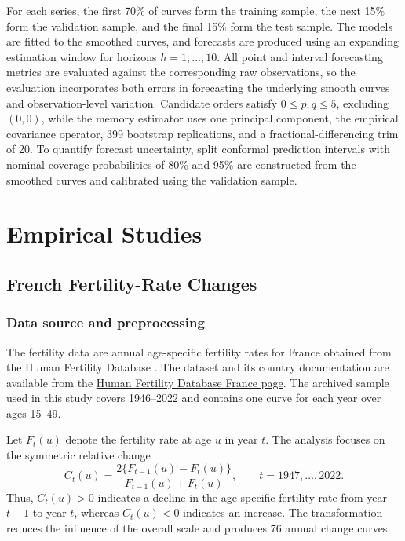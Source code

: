 For each series, the first 70\% of curves form the training sample, the next 15\% form the validation sample, and the final 15\% form the test sample. The models are fitted to the smoothed curves, and forecasts are produced using an expanding estimation window for horizons $h=1,\ldots,10$. All point and interval forecasting metrics are evaluated against the corresponding raw observations, so the evaluation incorporates both errors in forecasting the underlying smooth curves and observation-level variation. Candidate orders satisfy $0\leq p,q\leq5$, excluding $(0,0)$, while the memory estimator uses one principal component, the empirical covariance operator, 399 bootstrap replications, and a fractional-differencing trim of 20. To quantify forecast uncertainty, split conformal prediction intervals with nominal coverage probabilities of 80\% and 95\% are constructed from the smoothed curves and calibrated using the validation sample.

\section{Empirical Studies}
\label{sec:emp-studies}

\subsection{French Fertility-Rate Changes}
\label{sec:emp-fertility}

\subsubsection{Data source and preprocessing}

The fertility data are annual age-specific fertility rates for France obtained from the Human Fertility Database \citep{HFD26}. The dataset and its country documentation are available from the \href{https://www.humanfertility.org/Country/Country?cntr=FRATNP}{Human Fertility Database France page}. The archived sample used in this study covers 1946--2022 and contains one curve for each year over ages 15--49.

Let $F_t(u)$ denote the fertility rate at age $u$ in year $t$. The analysis focuses on the symmetric relative change
\begin{equation}
    C_t(u)
    =
    \frac{2\{F_{t-1}(u)-F_t(u)\}}
         {F_{t-1}(u)+F_t(u)},
    \qquad t=1947,\ldots,2022.
    \label{eq:emp-fertility-change}
\end{equation}
Thus, $C_t(u)>0$ indicates a decline in the age-specific fertility rate from year $t-1$ to year $t$, whereas $C_t(u)<0$ indicates an increase. The transformation reduces the influence of the overall scale and produces 76 annual change curves.


